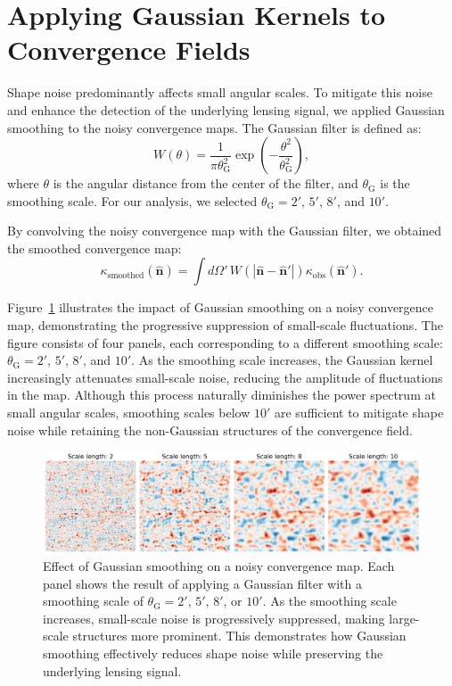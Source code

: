 \section{Applying Gaussian Kernels to Convergence Fields}
Shape noise predominantly affects small angular scales. To mitigate this noise and enhance the detection of the underlying lensing signal, we applied Gaussian smoothing to the noisy convergence maps. The Gaussian filter is defined as:
\begin{equation}
    W(\theta) = \frac{1}{\pi \theta_{\mathrm{G}}^2} \exp\left( -\frac{\theta^2}{\theta_{\mathrm{G}}^2} \right),
\end{equation}
where $\theta$ is the angular distance from the center of the filter, and $\theta_{\mathrm{G}}$ is the smoothing scale. For our analysis, we selected $\theta_{\mathrm{G}} = 2'$, $5'$, $8'$, and $10'$.

By convolving the noisy convergence map with the Gaussian filter, we obtained the smoothed convergence map:
\begin{equation}
    \kappa_{\mathrm{smoothed}}(\hat{\mathbf{n}}) = \int d\Omega' \, W(|\hat{\mathbf{n}} - \hat{\mathbf{n}}'|) \kappa_{\mathrm{obs}}(\hat{\mathbf{n}}').
\end{equation}

Figure~\ref{fig:smoothing} illustrates the impact of Gaussian smoothing on a noisy convergence map, demonstrating the progressive suppression of small-scale fluctuations. The figure consists of four panels, each corresponding to a different smoothing scale: $\theta_{\mathrm{G}} = 2'$, $5'$, $8'$, and $10'$. As the smoothing scale increases, the Gaussian kernel increasingly attenuates small-scale noise, reducing the amplitude of fluctuations in the map. Although this process naturally diminishes the power spectrum at small angular scales, smoothing scales below $10'$ are sufficient to mitigate shape noise while retaining the non-Gaussian structures of the convergence field.
\begin{figure}[ht]
    \centering
    \includegraphics[width=\textwidth]{figures/smoothed_comparison.png}
    \caption[Gaussian smoothing on a noisy convergence map for multiple smoothing scales]{Effect of Gaussian smoothing on a noisy convergence map. Each panel shows the result of applying a Gaussian filter with a smoothing scale of \(\theta_{\mathrm{G}} = 2'\), \(5'\), \(8'\), or \(10'\). As the smoothing scale increases, small-scale noise is progressively suppressed, making large-scale structures more prominent. This demonstrates how Gaussian smoothing effectively reduces shape noise while preserving the underlying lensing signal.}
    \label{fig:smoothing}
\end{figure}

